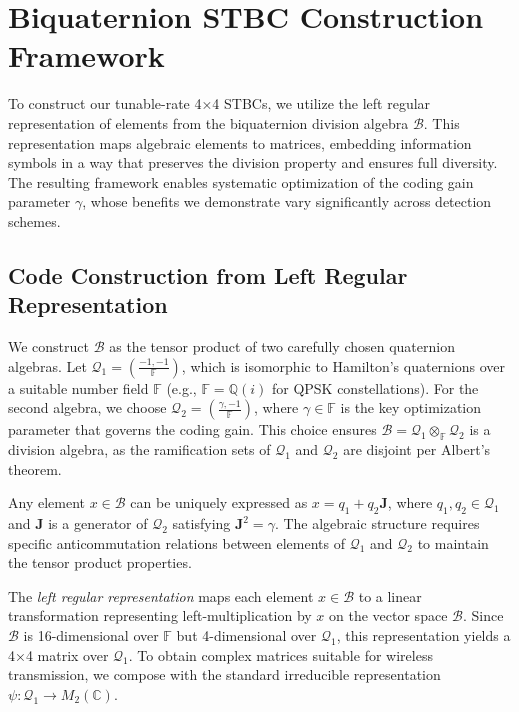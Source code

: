 \section{Biquaternion STBC Construction Framework}
To construct our tunable-rate 4×4 STBCs, we utilize the left regular representation of elements from the biquaternion division algebra $\mathcal{B}$. This representation maps algebraic elements to matrices, embedding information symbols in a way that preserves the division property and ensures full diversity. The resulting framework enables systematic optimization of the coding gain parameter $\gamma$, whose benefits we demonstrate vary significantly across detection schemes.

\subsection{Code Construction from Left Regular Representation}

We construct $\mathcal{B}$ as the tensor product of two carefully chosen quaternion algebras. Let $\mathcal{Q}_1 = \left(\frac{-1,-1}{\mathbb{F}}\right)$, which is isomorphic to Hamilton's quaternions over a suitable number field $\mathbb{F}$ (e.g., $\mathbb{F} = \mathbb{Q}(i)$ for QPSK constellations). For the second algebra, we choose $\mathcal{Q}_2 = \left(\frac{\gamma,-1}{\mathbb{F}}\right)$, where $\gamma \in \mathbb{F}$ is the key optimization parameter that governs the coding gain. This choice ensures $\mathcal{B} = \mathcal{Q}_1 \otimes_{\mathbb{F}} \mathcal{Q}_2$ is a division algebra, as the ramification sets of $\mathcal{Q}_1$ and $\mathcal{Q}_2$ are disjoint per Albert's theorem.

Any element $x \in \mathcal{B}$ can be uniquely expressed as $x = q_1 + q_2 \mathbf{J}$, where $q_1, q_2 \in \mathcal{Q}_1$ and $\mathbf{J}$ is a generator of $\mathcal{Q}_2$ satisfying $\mathbf{J}^2 = \gamma$. The algebraic structure requires specific anticommutation relations between elements of $\mathcal{Q}_1$ and $\mathcal{Q}_2$ to maintain the tensor product properties.

The \emph{left regular representation} maps each element $x \in \mathcal{B}$ to a linear transformation representing left-multiplication by $x$ on the vector space $\mathcal{B}$. Since $\mathcal{B}$ is 16-dimensional over $\mathbb{F}$ but 4-dimensional over $\mathcal{Q}_1$, this representation yields a 4×4 matrix over $\mathcal{Q}_1$. To obtain complex matrices suitable for wireless transmission, we compose with the standard irreducible representation $\psi: \mathcal{Q}_1 \to M_2(\mathbb{C})$.

